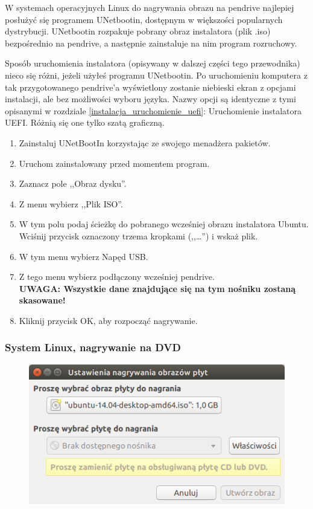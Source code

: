 W systemach operacyjnych Linux do nagrywania obrazu na pendrive najlepiej posłużyć się programem \textcolor{ubuntu_orange}{UNetbootin}, dostępnym w większości popularnych dystrybucji. UNetbootin rozpakuje pobrany obraz instalatora (plik .iso) bezpośrednio na pendrive, a następnie zainstaluje na nim program rozruchowy.

Sposób uruchomienia instalatora (opisywany w dalszej części tego przewodnika) nieco się różni, jeżeli użyłeś programu UNetbootin. Po uruchomieniu komputera z tak przygotowanego pendrive'a wyświetlony zostanie niebieski ekran z opcjami instalacji, ale bez możliwości wyboru języka. Nazwy opcji są identyczne z tymi opisanymi w rozdziale \ref{instalacja_uruchomienie_uefi}: Uruchomienie instalatora UEFI. Różnią się one tylko szatą graficzną.
\begin{enumerate}[label=\protect\circled{\arabic*}]
\item Zainstaluj UNetBootIn korzystając ze swojego menadżera pakietów.
\item Uruchom zainstalowany przed momentem program.
\item Zaznacz pole ,,Obraz dysku''.
\item Z menu wybierz ,,Plik ISO''.
\item W tym polu podaj ścieżkę do pobranego wcześniej obrazu instalatora Ubuntu. Wciśnij przycisk oznaczony trzema kropkami (,,\ldots'') i wskaż plik.
\item W tym menu wybierz Napęd USB.
\item Z tego menu wybierz podłączony wcześniej pendrive.\\
\textbf{UWAGA: Wszystkie dane znajdujące się na tym nośniku zostaną skasowane!}
\item Kliknij przycisk \textcolor{ubuntu_orange}{OK}, aby rozpocząć nagrywanie.
\end{enumerate}

\subsubsection{System Linux, nagrywanie na DVD}
\begin{figure}
	\vspace{-10pt}
	\includegraphics[width=\linewidth]{images/instalacja_nagrywanie_obrazu_linux_DVD.png}
\end{figure}

